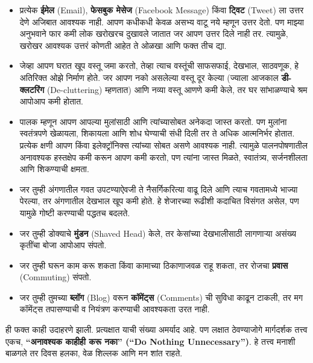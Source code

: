 \begin{itemize}
 \item प्रत्येक \textbf{ईमेल} (Email), \textbf{फेसबुक मेसेज} (Facebook Message) किंवा \textbf{ट्विट} (Tweet) ला उत्तर देणे अजिबात आवश्यक नाही. आपण कधीकधी केवळ असभ्य वाटू नये म्हणून उत्तर देतो. पण माझ्या अनुभवाने फार कमी लोक खरोखरच दुखावले जातात जर आपण उत्तर दिले नाही तर. त्यामुळे, खरोखर आवश्यक उत्तरं कोणती आहेत ते ओळखा आणि फक्त तीच द्या.
\item जेव्हा आपण घरात खूप वस्तू जमा करतो, तेव्हा त्याच वस्तूंची साफसफाई, देखभाल, साठवणूक,  हे अतिरिक्त ओझे निर्माण होते. जर आपण नको असलेल्या वस्तू दूर केल्या (ज्याला आजकाल \textbf{डी-क्लटरिंग} (De-cluttering) म्हणतात) आणि नव्या वस्तू आणणे कमी केले, तर घर सांभाळण्याचे श्रम आपोआप कमी होतात.
\item पालक म्हणून आपण आपल्या मुलांसाठी आणि त्यांच्यासोबत अनेकदा जास्त करतो. पण मुलांना स्वतंत्रपणे खेळायला, शिकायला आणि शोध घेण्याची संधी दिली तर ते अधिक आत्मनिर्भर होतात. प्रत्येक क्षणी आपण किंवा इलेक्ट्रॉनिक्स त्यांच्या सोबत असणे आवश्यक नाही. त्यामुळे पालनपोषणातील अनावश्यक हस्तक्षेप कमी करून आपण कमी करतो, पण त्यांना जास्त मिळते,  स्वातंत्र्य, सर्जनशीलता आणि शिकण्याची क्षमता.
\item जर तुम्ही अंगणातील गवत उपटण्याऐवजी ते नैसर्गिकरित्या वाढू दिले आणि त्याच गवतामध्ये भाज्या पेरल्या, तर अंगणातील देखभाल खूप कमी होते. हे शेजारच्या रूढीशी कदाचित विसंगत असेल, पण यामुळे गोष्टी करण्याची पद्धतच बदलते.
\item जर तुम्ही डोक्याचे \textbf{मुंडन} (Shaved Head) केले, तर केसांच्या देखभालीसाठी लागणाऱ्या असंख्य कृतींचा बोजा आपोआप संपतो.
\item जर तुम्ही घरून काम करू शकता किंवा कामाच्या ठिकाणाजवळ राहू शकता, तर रोजचा \textbf{प्रवास} (Commuting) संपतो.
\item जर तुम्ही तुमच्या \textbf{ब्लॉग} (Blog) वरून \textbf{कॉमेंट्स} (Comments) ची सुविधा काढून टाकली, तर मग कॉमेंट्स तपासण्याची व नियंत्रण करण्याची आवश्यकता उरत नाही.
 \end{itemize}
ही फक्त काही उदाहरणे झाली. प्रत्यक्षात याची संख्या अमर्याद आहे. पण लक्षात ठेवण्याजोगे मार्गदर्शक तत्त्व एकच,  \textbf{``अनावश्यक काहीही करू नका'' (``Do Nothing Unnecessary'')}. हे तत्त्व मनाशी बाळगले तर दिवस हलका, वेळ शिल्लक आणि मन शांत राहते.


